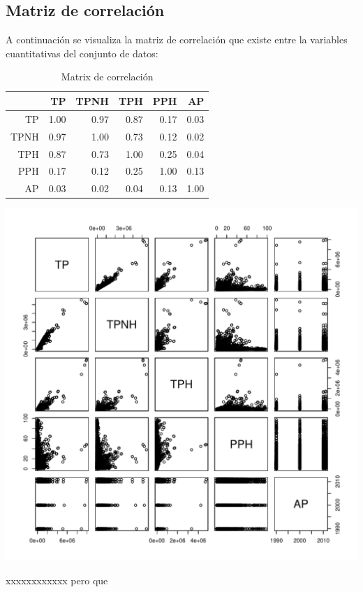 \subsection{Matriz de correlación}
A continuación se visualiza la matriz de correlación que existe entre la variables cuantitativas del conjunto de datos: 
\begin{table}[ht]
\centering
\begin{tabular}{rrrrrr}
  \hline
 & TP & TPNH & TPH & PPH & AP \\ 
  \hline
TP & 1.00 & 0.97 & 0.87 & 0.17 & 0.03 \\ 
  TPNH & 0.97 & 1.00 & 0.73 & 0.12 & 0.02 \\ 
  TPH & 0.87 & 0.73 & 1.00 & 0.25 & 0.04 \\ 
  PPH & 0.17 & 0.12 & 0.25 & 1.00 & 0.13 \\ 
  AP & 0.03 & 0.02 & 0.04 & 0.13 & 1.00 \\ 
   \hline
\end{tabular}
\caption{Matrix de correlación} 
\end{table}

\includegraphics[width=\maxwidth]{figure/correlacion-1} 


xxxxxxxxxxxx pero que 
